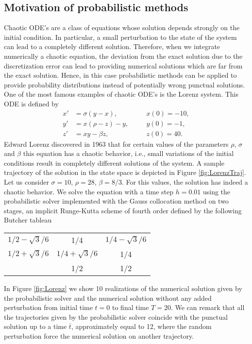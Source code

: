 \subsection{Motivation of probabilistic methods}\label{sec:probMotivation}

Chaotic ODE's are a class of equations whose solution depends strongly on the initial condition. In particular, a small perturbation to the state of the system can lead to a completely different solution. Therefore, when we integrate numerically a chaotic equation, the deviation from the exact solution due to the discretization error can lead to providing numerical solutions which are far from the exact solution. Hence, in this case probabilistic methods can be applied to provide probability distributions instead of potentially wrong punctual solutions.\\
One of the most famous examples of chaotic ODE's is the Lorenz system. This ODE is defined by
\begin{equation}\label{eq:Lorenz}
\begin{aligned}
x' &= \sigma(y - x), \quad &&x(0) = -10,\\
y' &= x(\rho - z) - y, \quad &&y(0) = -1,\\
z' &= xy - \beta z, \quad &&z(0) = 40.
\end{aligned}
\end{equation}
Edward Lorenz discovered in 1963 that for certain values of the parameters $\rho$, $\sigma$ and $\beta$ this equation has a chaotic behavior, i.e., small variations of the initial conditions result in completely different solutions of the system. A sample trajectory of the solution in the state space is depicted in Figure \ref{fig:LorenzTraj}. \\
Let us consider $\sigma = 10$, $\rho = 28$, $\beta = 8/3$. For this values, the solution has indeed a chaotic behavior. We solve the equation with a time step $h = 0.01$ using the probabilistic solver implemented with the Gauss collocation method on two stages, an implicit Runge-Kutta scheme of fourth order defined by the following Butcher tableau
\begin{center}
	\begin{tabular}{c|cc}
		$1/2-\sqrt{3}/6$ & 1/4 & $1/4-\sqrt{3}/6$ \\
		$1/2+\sqrt{3}/6$ & $1/4+\sqrt{3}/6$ & 1/4 \\
		\hline 
		& 1/2 & 1/2 
	\end{tabular}
\end{center} 
In Figure \ref{fig:Lorenz} we show 10 realizations of the numerical solution given by the probabilistic solver and the numerical solution without any added perturbation from initial time $t = 0$ to final time $T = 20$. We can remark that all the trajectories given by the probabilistic solver coincide with the punctual solution up to a time $\bar t$, approximately equal to 12, where the random perturbation force the numerical solution on another trajectory. 

